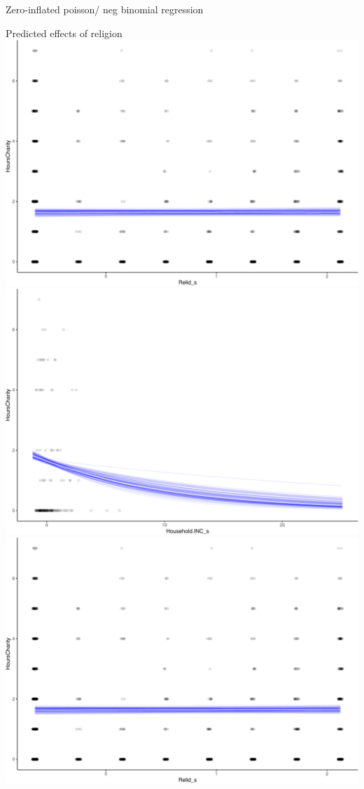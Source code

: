 \documentclass[
  ignorenonframetext,
]{beamer}
\begin{document}
\begin{frame}[fragile]{Zero-inflated poisson/ neg binomial regression}
\begin{block}{Predicted effects of religion}
\protect\hypertarget{predicted-effects-of-religion}{}
\includegraphics{slides_files/figure-beamer/unnamed-chunk-54-1.pdf}
\includegraphics{slides_files/figure-beamer/unnamed-chunk-54-2.pdf}
\includegraphics{slides_files/figure-beamer/unnamed-chunk-54-3.pdf}
\end{block}


\end{frame}
\end{document}
